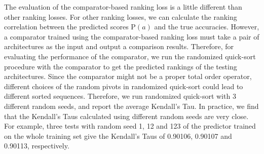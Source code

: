 The evaluation of the comparator-based ranking loss is a little different than other ranking losses. For other ranking losses, we can calculate the ranking correlation between the predicted scores $\mbox{P}(a)$ and the true accuracies. However, a comparator trained using the comparator-based ranking loss must take a pair of architectures as the input and output a comparison results. Therefore, for evaluating the performance of the comparator,
we run the randomized quick-sort procedure with the comparator to get the predicted rankings of the testing architectures. Since the comparator might not be a proper total order operator, different choices of the random pivots in randomized quick-sort could lead to different sorted sequences. Therefore, we run randomized quick-sort with 3 different random seeds, and report the average Kendall's Tau. In practice, we find that the Kendall's Taus calculated using different random seeds are very close. For example, three tests with random seed 1, 12 and 123 of the predictor trained on the whole training set give the Kendall's Taus of 0.90106, 0.90107 and 0.90113, respectively.



